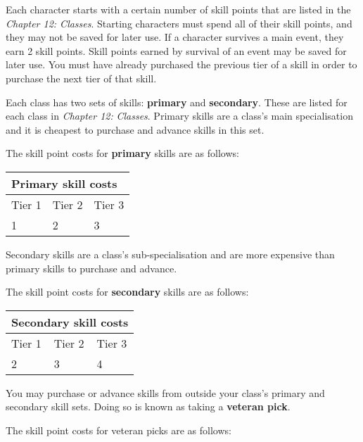 Each character starts with a certain number of skill points that are listed in the \textit{Chapter 12: Classes}. Starting characters must spend all of their skill points, and they may not be saved for later use. If a character survives a main event, they earn 2 skill points. Skill points earned by survival of an event may be saved for later use. You must have already purchased the previous tier of a skill in order to purchase the next tier of that skill.

Each class has two sets of skills: \textbf{primary} and \textbf{secondary}. These are listed for each class in \textit{Chapter 12:} \textit{Classes}. Primary skills are a class's main specialisation and it is cheapest to purchase and advance skills in this set.

The skill point costs for \textbf{primary} skills are as follows:

\begin{table}[H]
\begin{tabular}{|l|l|l|} \hline 
\multicolumn{3}{|l|}{Primary skill costs} \\
 \hline Tier 1 & Tier 2 & Tier 3 \\
 \hline 1 & 2 & 3 \\
 \hline \end{tabular}

\end{table}

Secondary skills are a class's sub-specialisation and are more expensive than primary skills to purchase and advance.

The skill point costs for \textbf{secondary} skills are as follows:

\begin{table}[H]
\begin{tabular}{|l|l|l|} \hline 
\multicolumn{3}{|l|}{Secondary skill costs} \\
 \hline Tier 1 & Tier 2 & Tier 3 \\
 \hline 2 & 3 & 4 \\
 \hline \end{tabular}

\end{table}

You may purchase or advance skills from outside your class's primary and secondary skill sets. Doing so is known as taking a \textbf{veteran pick}.

The skill point costs for veteran picks are as follows:


